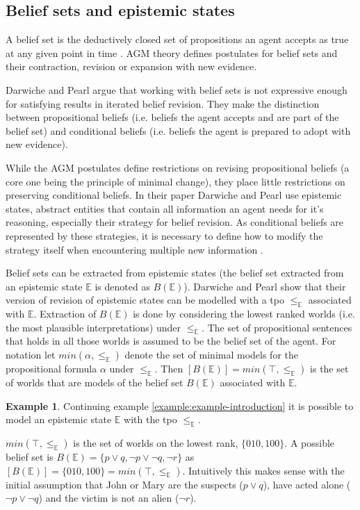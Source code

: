 \documentclass[11pt]{scrartcl}
\theoremstyle{definition}
\newtheorem{example}{Example}[section]
\begin{document}
\subsection{Belief sets and epistemic states}
A belief set is the deductively closed set of propositions an agent accepts as true at any given point in time \cite{Ferme2011}. AGM theory \cite{Alchourron1985} defines postulates for belief sets and their contraction, revision or expansion with new evidence.

Darwiche and Pearl \cite{Darwiche1997} argue that working with belief sets is not expressive enough for satisfying results in iterated belief revision. They make the distinction between propositional beliefs (i.e. beliefs the agent accepts and are part of the belief set) and conditional beliefs (i.e. beliefs the agent is prepared to adopt with new evidence).

While the AGM postulates define restrictions on revising propositional beliefs (a core one being the principle of minimal change), they place little restrictions on preserving conditional beliefs. In their paper Darwiche and Pearl use epistemic states, abstract entities that contain all information an agent needs for it's reasoning, especially their strategy for belief revision. As conditional beliefs are represented by these strategies, it is necessary to define how to modify the strategy itself when encountering multiple new information \cite{Darwiche1997}.

Belief sets can be extracted from epistemic states (the belief set extracted from an epistemic state $\mathbb{E}$ is denoted as $B(\mathbb{E})$). Darwiche and Pearl show that their version of revision of epistemic states can be modelled with a tpo $\leq_{\mathbb{E}}$ associated with $\mathbb{E}$. Extraction of $B(\mathbb{E})$ is done by considering the lowest ranked worlds (i.e. the most plausible interpretations) under $\leq_{\mathbb{E}}$. The set of propositional sentences that holds in all those worlds is assumed to be the belief set of the agent. For notation let $min(\alpha, \leq_{\mathbb{E}})$ denote the set of minimal models for the propositional formula $\alpha$ under $\leq_{\mathbb{E}}$. Then $[B(\mathbb{E})] = min(\top, \leq_{\mathbb{E}})$ is the set of worlds that are models of the belief set $B(\mathbb{E})$ associated with $\mathbb{E}$.

\begin{example}
    Continuing example \ref{example:example-introduction} it is possible to model an epistemic state $\mathbb{E}$ with the tpo $\leq_{\mathbb{E}}$.
    
    $min(\top, \leq_{\mathbb{E}})$ is the set of worlds on the lowest rank, $\{010, 100\}$. A possible belief set is $B(\mathbb{E}) = \{p \vee q, \neg p \vee \neg q, \neg r\}$ as $[B(\mathbb{E})] = \{010, 100\} = min(\top, \leq_{\mathbb{E}})$. Intuitively this makes sense with the initial assumption that John or Mary are the suspects ($p \vee q$), have acted alone ($\neg p \vee \neg q$) and the victim is not an alien ($\neg r$).
\end{example}
\end{document}
